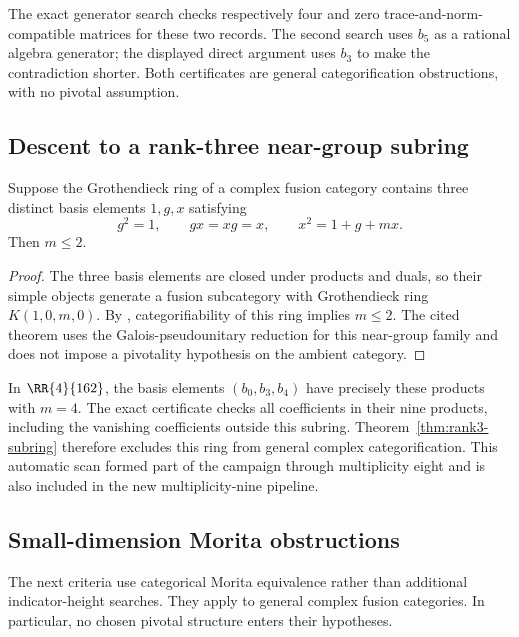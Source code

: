 The exact generator search checks respectively four and zero
trace-and-norm-compatible matrices for these two records. The second
search uses $b_5$ as a rational algebra generator; the displayed direct
argument uses $b_3$ to make the contradiction shorter. Both certificates
are general categorification obstructions, with no pivotal assumption.


\subsection{Descent to a rank-three near-group subring}
\begin{theorem}\label{thm:rank3-subring}
Suppose the Grothendieck ring of a complex fusion category contains
three distinct basis elements $1,g,x$ satisfying
\[
 g^2=1,\qquad gx=xg=x,\qquad x^2=1+g+mx.
\]
Then $m\leq2$.
\end{theorem}
\begin{proof}
The three basis elements are closed under products and duals, so their
simple objects generate a fusion subcategory with Grothendieck ring
$K(1,0,m,0)$. By \cite[Theorem~4.1]{Ostrik3}, categorifiability of this
ring implies $m\leq2$. The cited theorem uses the Galois-pseudounitary
reduction for this near-group family and does not impose a pivotality
hypothesis on the ambient category.
\end{proof}

In $\RR{4}{162}$, the basis elements $(b_0,b_3,b_4)$ have precisely
these products with $m=4$. The exact certificate checks all coefficients
in their nine products, including the vanishing coefficients outside
this subring. Theorem~\ref{thm:rank3-subring} therefore excludes this
ring from general complex categorification. This automatic scan formed
part of the campaign through multiplicity eight and is also included in
the new multiplicity-nine pipeline.

\subsection{Small-dimension Morita obstructions}\label{sec:small-morita}
The next criteria use categorical Morita equivalence rather than additional
indicator-height searches. They apply to general complex fusion categories.
In particular, no chosen pivotal structure enters their hypotheses.

